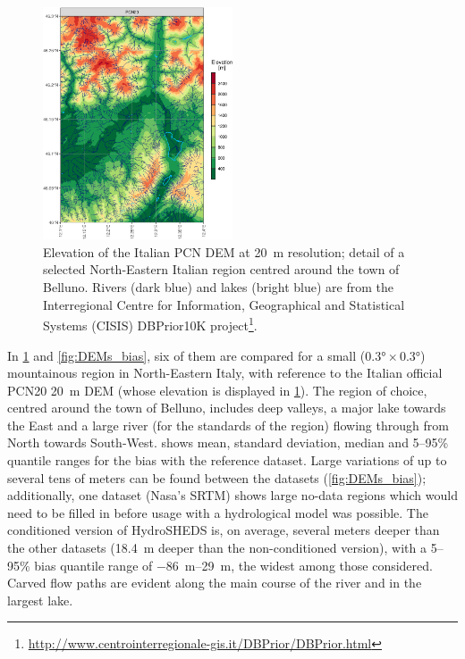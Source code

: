 \begin{figure}
    \centering
    \includegraphics[width=0.5\textwidth]{figures/DEM/PCN20.png}
    \decoRule
    \caption[Comparison of DEMs: PCN20]{
    Elevation of the Italian PCN DEM at \SI{20}{\metre} resolution; detail of a selected North-Eastern Italian region centred around the town of Belluno. Rivers (dark blue) and lakes (bright blue) are from the Interregional Centre for Information, Geographical and Statistical Systems (CISIS) DBPrior10K project\footnote{\url{http://www.centrointerregionale-gis.it/DBPrior/DBPrior.html}}.
    }
    \label{fig:PCN20}
\end{figure}
In \cref{fig:PCN20} and \ref{fig:DEMs_bias}, six of them are compared for a small ($\ang{0.3}\times\ang{0.3}$) mountainous region in North-Eastern Italy, with reference to the Italian official PCN20 \SI{20}{\metre} DEM (whose elevation is displayed in \cref{fig:PCN20}). 
The region of choice, centred around the town of Belluno, includes deep valleys, a major lake towards the East and a large river (for the standards of the region) flowing through from North towards South-West.
 shows mean, standard deviation, median and 5--95\% quantile ranges for the bias with the reference dataset. Large variations of up to several tens of meters can be found between the datasets (\cref{fig:DEMs_bias}); additionally, one dataset (Nasa's SRTM) shows large no-data regions which would need to be filled in before usage with a hydrological model was possible. The conditioned version of HydroSHEDS is, on average, several meters deeper than the other datasets (\SI{18.4}{\metre} deeper than the non-conditioned version), with a 5--95\% bias quantile range of \SIrange{-86}{29}{\metre}, the widest among those considered. Carved flow paths are evident along the main course of the river and in the largest lake.

